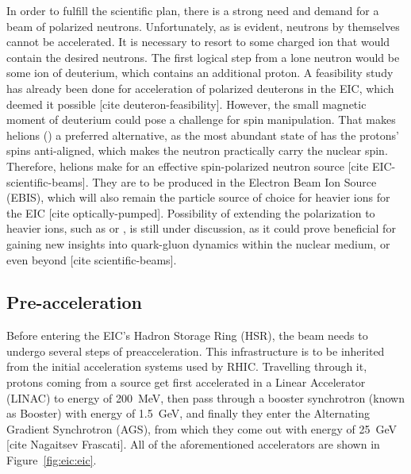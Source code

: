 In order to fulfill the scientific plan, there is a strong need and demand for a beam of polarized neutrons. Unfortunately, as is evident, neutrons by themselves cannot be accelerated. It is necessary to resort to some charged ion that would contain the desired neutrons. The first logical step from a lone neutron would be some ion of deuterium, which contains an additional proton. A feasibility study has already been done for acceleration of polarized deuterons in the EIC, which deemed it possible [cite deuteron-feasibility]. However, the small magnetic moment of deuterium could pose a challenge for spin manipulation. That makes helions () a preferred alternative, as the most abundant state of  has the protons' spins anti-aligned, which makes the neutron practically carry the nuclear spin. Therefore, helions make for an effective spin-polarized neutron source [cite EIC-scientific-beams]. They are to be produced in the Electron Beam Ion Source (EBIS), which will also remain the particle source of choice for heavier ions for the EIC [cite optically-pumped]. Possibility of extending the polarization to heavier ions, such as  or , is still under discussion, as it could prove beneficial for gaining new insights into quark-gluon dynamics within the nuclear medium, or even beyond [cite scientific-beams]. 

\subsection{Pre-acceleration}
Before entering the EIC's Hadron Storage Ring (HSR), the beam needs to undergo several steps of preacceleration. This infrastructure is to be inherited from the initial acceleration systems used by RHIC. Travelling through it, protons coming from a source get first accelerated in a Linear Accelerator (LINAC) to energy of 200~MeV, then pass through a booster synchrotron (known as Booster) with energy of 1.5~GeV, and finally they enter the Alternating Gradient Synchrotron (AGS), from which they come out with energy of 25~GeV [cite Nagaitsev Frascati]. All of the aforementioned accelerators are shown in Figure~\ref{fig:eic:eic}.

